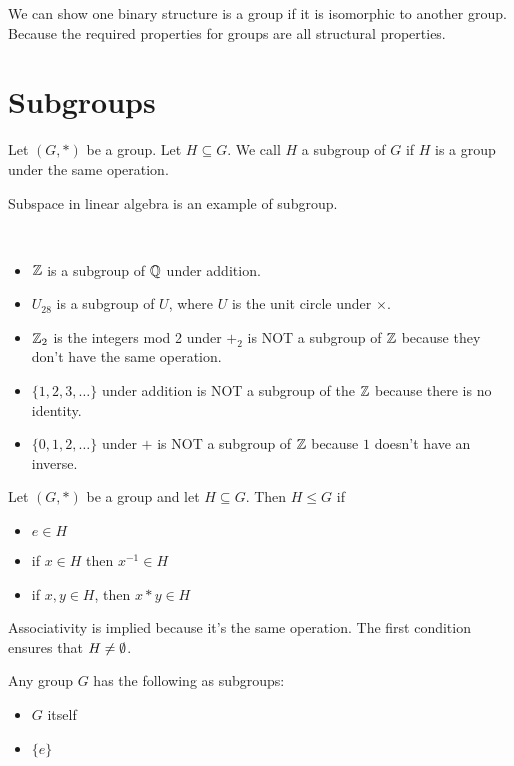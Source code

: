 \documentclass[class=article,crop=false]{standalone}
\begin{document}
We can show one binary structure is a group if it is isomorphic to another group. Because the required properties for groups are all structural properties.

\section{Subgroups}
\begin{defn}[subgroup]
	Let $(G,*)$ be a group. Let  $H \subseteq G$. We call $H$ a subgroup of  $G$ if  $H$ is a group under the same operation.
\end{defn}

\begin{note}[]
Subspace in linear algebra is an example of subgroup.
\end{note}
\begin{eg}[]
	~\begin{itemize}
		\item $\mathbb{Z}$ is a subgroup of $\mathbb{Q}$ under addition.
	\item $U_{28}$ is a subgroup of $U$, where  $U$ is the unit circle under $\times $.
	\item $\mathbb{Z}_2$ is the integers mod 2 under $+_2$ is NOT a subgroup of $\mathbb{Z}$ because they don't have the same operation.
	\item $\{1,2,3,\ldots\} $ under addition is NOT a subgroup of the $\mathbb{Z}$ because there is no identity.
	\item $\{0,1,2,\ldots\}$ under $+ $ is NOT a subgroup of $\mathbb{Z}$ because $1$ doesn't have an inverse.
	\end{itemize}
\end{eg}

\begin{thm}[]
	Let $(G,*)$ be a group and let  $H \subseteq G$. Then $H\leq G$ if 
\begin{itemize}
	\item $e \in H$
	\item if $x \in H$ then $x^{-1} \in H$ 
	\item if $x,y \in H$, then $x*y \in H$
\end{itemize}
\end{thm}

\begin{note}[]
	Associativity is implied because it's the same operation. The first condition ensures that $H \neq \emptyset$.
\end{note}

\begin{coro}[]
	Any group $G$ has the following as subgroups:
	 \begin{itemize}
		\item $G$ itself
		\item $\{e\} $
	\end{itemize}
\end{coro}
\end{document}
